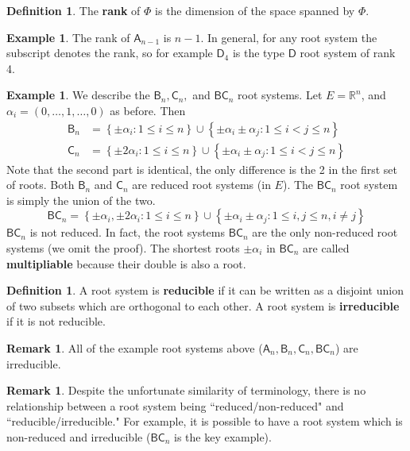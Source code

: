 \documentclass[12pt]{article}
\theoremstyle{definition}
\newtheorem{definition}[theorem]{Definition}
\newtheorem{example}[theorem]{Example}
\newtheorem{remark}[theorem]{Remark}
\newcommand{\R}{\mathbb{R}}
\newcommand{\lb}{\left\{}
\newcommand{\rb}{\right\}}
\newcommand{\tbf}{\textbf}
\begin{document}
\begin{definition}
The \tbf{rank} of $\Phi$ is the dimension of the space spanned by $\Phi$.
\end{definition}

\begin{example}
The rank of $\mathsf{A}_{n-1}$ is $n-1$. In general, for any root system the subscript denotes the rank, so for example $\mathsf{D}_4$ is the type $\mathsf{D}$ root system of rank 4.
\end{example}

\begin{example}
We describe the $\mathsf{B}_n, \mathsf{C}_n,$ and $\mathsf{BC}_n$ root systems. Let $E = \R^n$, and $\alpha_i = (0, \ldots, 1, \ldots, 0)$ as before. Then
\begin{align*}
	\mathsf{B}_n &= \lb \pm \alpha_i : 1 \le i \le n \rb \cup \lb \pm \alpha_i \pm \alpha_j : 1 \le i < j \le n \rb \\
	\mathsf{C}_n &= \lb \pm 2\alpha_i : 1 \le i \le n \rb \cup \lb \pm \alpha_i \pm \alpha_j : 1 \le i < j \le n \rb
\end{align*}
Note that the second part is identical, the only difference is the 2 in the first set of roots. Both $\mathsf{B}_n$ and $\mathsf{C}_n$ are reduced root systems (in $E$). The $\mathsf{BC}_n$ root system is simply the union of the two.
\[
	\mathsf{BC}_n = \lb \pm \alpha_i, \pm 2\alpha_i : 1 \le i \le n \rb \cup \lb \pm \alpha_i \pm \alpha_j : 1 \le i,j \le n, i \neq j \rb
\]
$\mathsf{BC}_n$ is not reduced. In fact, the root systems $\mathsf{BC}_n$ are the only non-reduced root systems (we omit the proof). The shortest roots $\pm \alpha_i$ in $\mathsf{BC}_n$ are called \tbf{multipliable} because their double is also a root.
\end{example}

\begin{definition}
A root system is \tbf{reducible} if it can be written as a disjoint union of two subsets which are orthogonal to each other. A root system is \tbf{irreducible} if it is not reducible.
\end{definition}

\begin{remark}
All of the example root systems above ($\mathsf{A}_n, \mathsf{B}_n, \mathsf{C}_n, \mathsf{BC}_n$) are irreducible.
\end{remark}

\begin{remark}
Despite the unfortunate similarity of terminology, there is no relationship between a root system being ``reduced/non-reduced" and ``reducible/irreducible." For example, it is possible to have a root system which is non-reduced and irreducible ($\mathsf{BC}_n$ is the key example). 
\end{remark}
\end{document}
